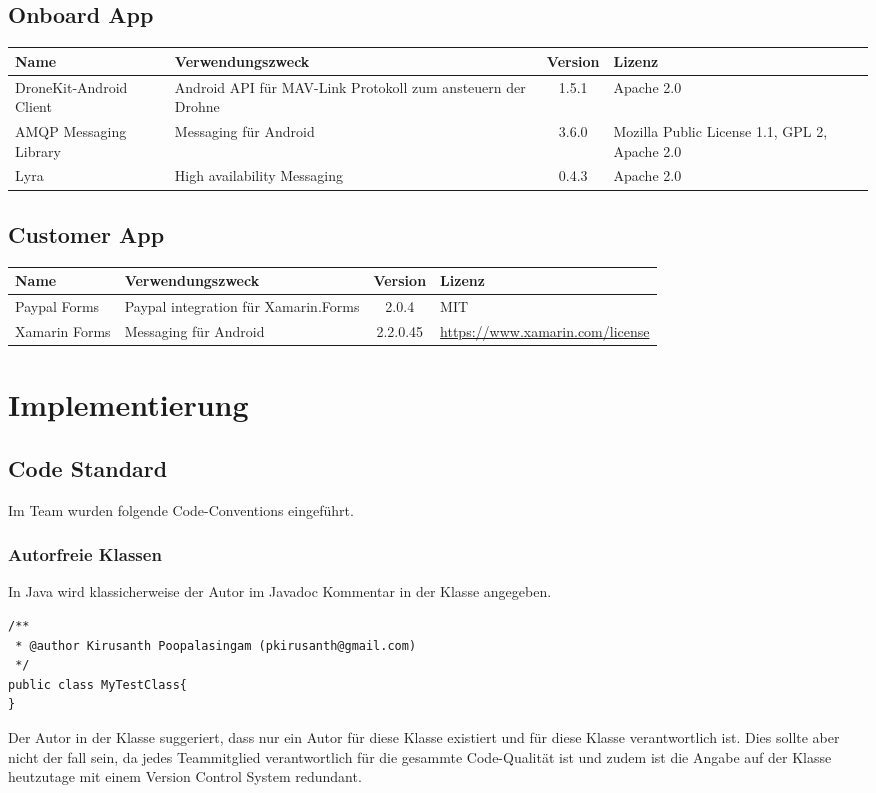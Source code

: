 \subsection{Onboard App}
\begin{tabularx}{\textwidth}{|X|X|c|X|}
	\hline
	\textbf{Name} & \textbf{Verwendungszweck} & \textbf{Version} & \textbf{Lizenz} \\
	\hline \hline
	DroneKit-Android Client & Android API für MAV-Link Protokoll zum ansteuern der Drohne & 1.5.1 & Apache 2.0\\
	\hline 
	AMQP Messaging Library & Messaging für Android & 3.6.0 &  Mozilla Public License 1.1, GPL 2,  Apache 2.0 \\
	\hline 
	Lyra  & High availability Messaging & 0.4.3 &  Apache 2.0 \\
	\hline 
\end{tabularx}
\subsection{Customer App}
\begin{tabularx}{\textwidth}{|X|X|c|X|}
	\hline
	\textbf{Name} & \textbf{Verwendungszweck} & \textbf{Version} & \textbf{Lizenz} \\
	\hline \hline
	Paypal Forms & Paypal integration für Xamarin.Forms & 2.0.4 & MIT \\
	\hline 
	Xamarin Forms & Messaging für Android & 2.2.0.45 & \url{https://www.xamarin.com/license} \\
	\hline 
\end{tabularx}


\section{Implementierung}

\subsection{Code Standard}
Im Team wurden folgende Code-Conventions eingeführt.

\subsubsection{Autorfreie Klassen}
In Java wird klassicherweise der Autor im Javadoc Kommentar in der Klasse angegeben.

\begin{lstlisting}
/**
 * @author Kirusanth Poopalasingam (pkirusanth@gmail.com)
 */
public class MyTestClass{
}
\end{lstlisting}
Der Autor in der Klasse suggeriert, dass nur ein Autor für diese Klasse existiert und für diese Klasse verantwortlich ist. Dies sollte aber nicht der fall sein, da jedes Teammitglied verantwortlich für die gesammte Code-Qualität ist und zudem ist die Angabe auf der Klasse heutzutage mit einem Version Control System redundant.

